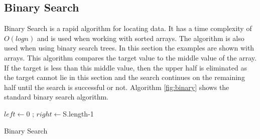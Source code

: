 \documentclass[10pt,twocolumn,hidelinks]{IEEEtran}
\begin{document}
\subsection{Binary Search}
Binary Search is a rapid algorithm for locating data. It has a time complexity of $O(log{n})$ and is used when working with sorted arrays. The algorithm is also used when using binary search trees. In this section the examples are shown with arrays. This algorithm compares the target value to the middle value of the array. If the target is less than this middle value, then the upper half is eliminated as the target cannot lie in this section and the search continues on the remaining half until the search is successful or not. Algorithm \ref{fig:binary} shows the standard binary search algorithm.
\IncMargin{1em}
\begin{algorithm}
\LinesNumbered
	
	$left \longleftarrow $0 ; $right \longleftarrow $S.length-1\\
\caption{Binary Search}
\label{fig:binary}
\end{algorithm}\DecMargin{1em}
\end{document}
